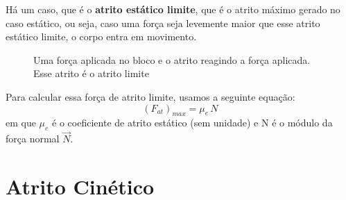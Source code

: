 \documentclass[12pt]{extarticle}
\newcommand{\<}{\langle}
\renewcommand{\>}{\rangle}
\theoremstyle{definition}
\begin{document}
Há um caso, que é o \textbf{atrito estático limite}, que é o atrito máximo gerado no caso estático, ou seja, caso uma força seja levemente maior que esse atrito estático limite, o corpo entra em movimento.

\begin{figure}[H]
    \centering
    \caption{Uma força aplicada no bloco e o atrito reagindo a força aplicada. Esse atrito é o atrito limite}
    \label{fig:atrito_estat_max}
\end{figure}

Para calcular essa força de atrito limite, usamos a seguinte equação:
\begin{equation}
    \left(F_{at}\right)_{max} = \mu_e\,N
\end{equation}
\noindent em que $\mu_e$ é o coeficiente de atrito estático (sem unidade) e N é o módulo da força normal $\vec{N}$.

\section{Atrito Cinético}
\end{document}
